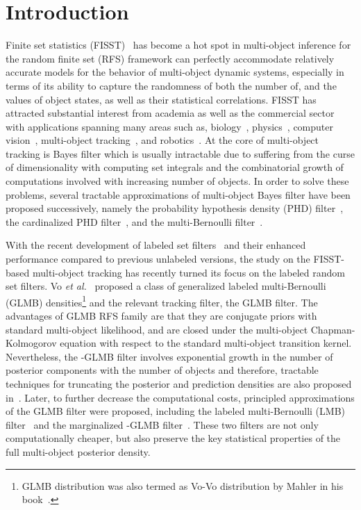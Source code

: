 \documentclass[journal]{IEEEtran}
\begin{document}
\section{Introduction}
Finite set statistics (FISST)~\cite{refr:Mahler_book} has become a hot spot  in multi-object inference for the random finite set (RFS) framework can perfectly accommodate relatively accurate models for the behavior of multi-object dynamic systems, especially in terms of its ability to capture the randomness of both the number of, and the values of object states, as well as their statistical correlations. FISST has attracted
substantial interest from academia as well as the commercial
sector with applications spanning many areas such as, biology~\cite{refr:biology}, physics~\cite{refr:physics}, computer vision~\cite{refr:vedio-tracking}, 
multi-object
tracking~\cite{refr:tracking-1,refr:tracking-2,refr:GCI-MB}, and robotics~\cite{refr:robotics}. At the core of multi-object tracking is Bayes filter which is usually intractable due to suffering from the curse of dimensionality with computing set integrals and the combinatorial growth of computations involved with increasing number of objects.  In order to solve these problems, several tractable approximations of multi-object Bayes filter have been proposed successively, namely the  probability hypothesis density (PHD) filter~\cite{refr:tracking-1,refr:PHD}, the  cardinalized PHD filter~\cite{refr:CPHD,refr:CPHD-2}, and the multi-Bernoulli filter~\cite{refr:Mahler_book,refr:MeMber_filter1,refr:MeMber_filter}.

With the recent development of labeled set  filters~\cite{refr:label_1,refr:label_2,refr:label_3,refr:label_4, refr:label_5, refr:label_6, refr:label_7,Vo-Vo-JMS,robust-distributed-fusion} and their enhanced performance  compared to previous unlabeled versions, 
the study on the FISST-based multi-object tracking has recently turned its focus on the labeled random set filters. Vo \textit{et al.}~\cite{refr:label_1} proposed  a class of generalized labeled multi-Bernoulli (GLMB) densities\footnote{GLMB distribution was also termed as Vo-Vo distribution by Mahler in his book~\cite{refr:tracking-2}.}  and the relevant tracking filter, the GLMB filter.  The advantages of GLMB RFS family are that they are conjugate priors with standard multi-object likelihood, and are closed under the multi-object Chapman-Kolmogorov equation with respect to the standard multi-object transition kernel. 
Nevertheless, the -GLMB filter involves exponential growth in the number of posterior components with the number of objects and therefore, tractable techniques for truncating the posterior and prediction densities are also proposed in~\cite{refr:label_2}. Later, to further  decrease the computational costs, principled approximations of the  GLMB filter were proposed, including the labeled multi-Bernoulli (LMB) filter~\cite{refr:label_5} and the marginalized -GLMB filter~\cite{refr:label_3}.  These two filters are not only computationally cheaper, but also preserve the key statistical properties of the full multi-object posterior density.
\end{document}

